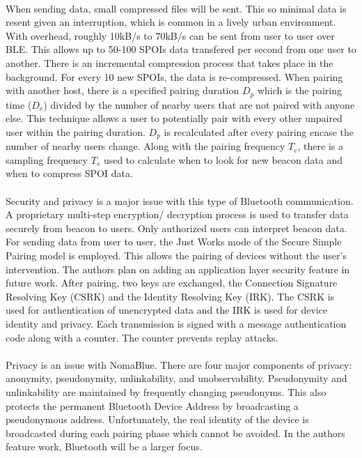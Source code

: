 \documentclass[a4paper,12pt]{article}
\begin{document}
\paragraph{}
When sending data, small compressed files will be sent. This so minimal data is resent given an interruption, which is common in a lively urban environment. With overhead, roughly 10kB/s to 70kB/s can be sent from user to user over BLE. This allows up to 50-100 SPOIs data transfered per second from one user to another. There is an incremental compression process that takes place in the background. For every 10 new SPOIs, the data is re-compressed. When pairing with another host, there is a specified pairing duration $D_p$ which is the pairing time ($D_e$) divided by the number of nearby users that are not paired with anyone else. This technique allows a user to potentially pair with every other unpaired user within the pairing duration. $D_p$ is recalculated after every pairing encase the number of nearby users change. Along with the pairing frequency $T_e$, there is a sampling frequency $T_s$ used to calculate when to look for new beacon data and when to compress SPOI data.
\paragraph{}
Security and privacy is a major issue with this type of Bluetooth communication. A proprietary multi-step encryption/ decryption process is used to transfer data securely from beacon to users. Only authorized users can interpret beacon data. For sending data from user to user, the Just Works mode of the Secure Simple Pairing model is employed. This allows the pairing of devices without the user's intervention. The authors plan on adding an application layer security feature in future work. After pairing, two keys are exchanged, the Connection Signature Resolving Key (CSRK) and the Identity Resolving Key (IRK). The CSRK is used for authentication of unencrypted data and the IRK is used for device identity and privacy. Each transmission is signed with a message authentication code along with a counter. The counter prevents replay attacks.
\paragraph{}
Privacy is an issue with NomaBlue. There are four major components of privacy: anonymity, pseudonymity, unlinkability, and unobservability. Pseudonymity and unlinkability are maintained by frequently changing pseudonyms. This also protects the permanent Bluetooth Device Address by broadcasting a pseudonymous address. Unfortunately, the real identity of the device is broadcasted during each pairing phase which cannot be avoided. In the authors feature work, Bluetooth will be a larger focus.
\end{document}
